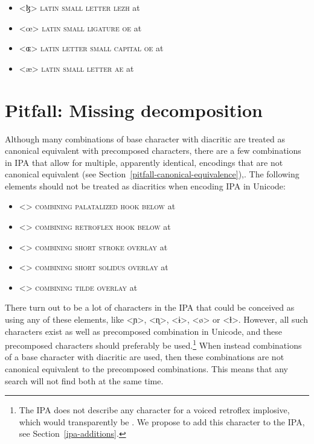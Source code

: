 \begin{itemize}
	\item[] <ɮ> \textsc{latin small letter lezh} at  
	\item[] <œ> \textsc{latin small ligature oe} at  
	\item[] <ɶ> \textsc{latin letter small capital oe} at  
	\item[] <æ> \textsc{latin small letter ae} at  
\end{itemize}

\section{Pitfall: Missing decomposition}
\label{pitfall-missing-decomposition}

Although many combinations of base character with diacritic are treated as
canonical equivalent with precomposed characters, there are a few combinations
in IPA that allow for multiple, apparently identical, encodings that are not
canonical equivalent (see Section~\ref{pitfall-canonical-equivalence}),. The
following elements should not be treated as diacritics when encoding IPA in
Unicode: 
\begin{itemize}
  \item[] <{}> \textsc{combining palatalized hook below} at 
  \item[] <{}> \textsc{combining retroflex hook below} at 
  \item[] <> \textsc{combining short stroke overlay} at 
  \item[] <> \textsc{combining short solidus overlay} at 
  \item[] <> \textsc{combining tilde overlay} at 
\end{itemize} 

There turn out to be a lot of characters in the IPA that could be conceived as
using any of these elements, like <ɲ>, <ɳ>, <ɨ>, <ø> or <ɫ>. However, all such
characters exist as well as precomposed combination in Unicode, and these
precomposed characters should preferably be used.\footnote{The IPA does not
describe any character for a voiced retroflex implosive, which would
transparently be . We propose to add this character to the IPA, see
Section~\ref{ipa-additions}.} When instead combinations of a base character with
diacritic are used, then these combinations are not canonical equivalent to the
precomposed combinations. This means that any search will not find both at the
same time.


